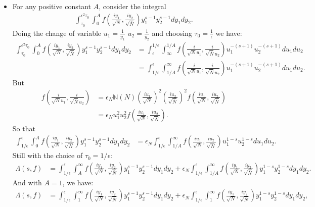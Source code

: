 \documentclass{article}
\theoremstyle{plain}
\begin{document}
\begin{itemize}
\item For any positive constant $A$, consider the integral  
\begin{align*}
\int_{\tau_0}^{\epsilon^2 \tau_0}\int_{0}^{A} f\left(\frac{iy_1}{\sqrt{N}},\frac{iy_2}{\sqrt{\bar{N}}}\right) y_1^{s-1}y_2^{s-1} dy_1 dy_2 .
\end{align*}
Doing the change of variable $u_1=\frac{1}{y_1}$ $u_2=\frac{1}{y_2}$ and choosing $\tau_0=\frac{1}{\epsilon}$ we have:
\begin{align*}
\int_{\tau_0}^{\epsilon^2 \tau_0}\int_{0}^{A} f\left(\frac{iy_1}{\sqrt{N}},\frac{iy_2}{\sqrt{\bar{N}}}\right) y_1^{s-1}y_2^{s-1} dy_1 dy_2 
&= \int_{\epsilon}^{1/\epsilon}\int_{\infty}^{1/A} f\left(\frac{i}{\sqrt{N}u_1},\frac{i}{\sqrt{\bar{N}}u_2}\right) u_1^{-(s+1)} u_2^{-(s+1)} du_1 du_2\\
&=  \int_{1/\epsilon}^{\epsilon}\int^{\infty}_{1/A} f\left(\frac{i}{\sqrt{N}u_1},\frac{i}{\sqrt{\bar{N}}u_2}\right) u_1^{-(s+1)} u_2^{-(s+1)} du_1 du_2.
\end{align*}
But 
\begin{align*}
f\left(\frac{i}{\sqrt{N}u_1},\frac{i}{\sqrt{\bar{N}}u_2}\right)&= \epsilon_N \mathbb{N}(N)\left(\frac{iu_1}{\sqrt{N}}\right)^2\left(\frac{iu_2}{\sqrt{\bar{N}}}\right)^2 f\left(\frac{iu_1}{\sqrt{N}},\frac{iu_2}{\sqrt{\bar{N}}}\right)\\
&= \epsilon_N u_1^2 u_2^2 f\left(\frac{iu_1}{\sqrt{N}},\frac{iu_2}{\sqrt{\bar{N}}}\right).
\end{align*}
So that
\begin{align*}
\int_{1/\epsilon}^{\epsilon}\int_{0}^{A} f\left(\frac{iy_1}{\sqrt{N}},\frac{iy_2}{\sqrt{\bar{N}}}\right) y_1^{s-1}y_2^{s-1}   dy_1 dy_2&=
\epsilon_N \int_{1/\epsilon}^{\epsilon} \int_{1/A}^{\infty} f\left(\frac{iu_1}{\sqrt{N}},\frac{iu_2}{\sqrt{\bar{N}}}\right) u_1^{1-s}u_2^{1-s}du_1 du_2.
\end{align*}
Still with the choice of $\tau_0=1/\epsilon$:
\begin{align}\label{niceformula}
\Lambda(s,f)&= \int_{1/\epsilon}^{\epsilon}\int_{A}^{\infty} f\left(\frac{iy_1}{\sqrt{N}},\frac{iy_2}{\sqrt{\bar{N}}}\right) y_1^{s-1}y_2^{s-1} dy_1 dy_2 + \epsilon_N \int_{1/\epsilon}^{\epsilon} \int_{1/A}^{\infty} f\left(\frac{iy_1}{\sqrt{N}},\frac{iy_2}{\sqrt{\bar{N}}}\right) y_1^{1-s}y_2^{1-s} dy_1 dy_2.
\end{align}
And with $A=1$, we have:
\begin{align}
\Lambda(s,f)&= \int_{1/\epsilon}^{\epsilon}\int_{1}^{\infty} f\left(\frac{iy_1}{\sqrt{N}},\frac{iy_2}{\sqrt{\bar{N}}}\right) y_1^{s-1}y_2^{s-1} dy_1 dy_2 + \epsilon_N \int_{1/\epsilon}^{\epsilon} \int_{1}^{\infty} f\left(\frac{iy_1}{\sqrt{N}},\frac{iy_2}{\sqrt{\bar{N}}}\right) y_1^{1-s}y_2^{1-s} dy_1 dy_2,

\end{align}
\end{itemize}
\end{document}
